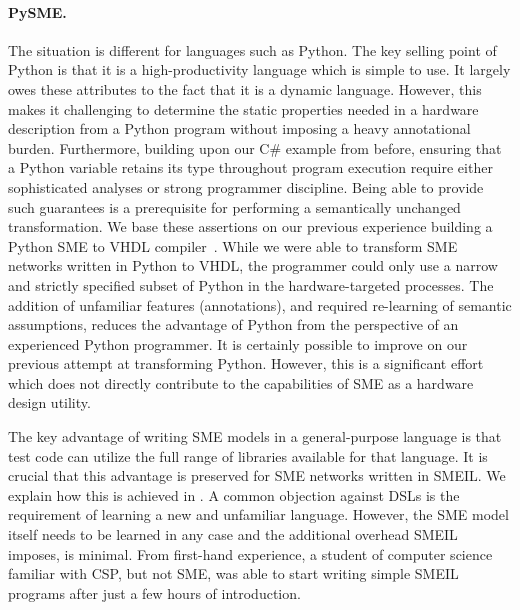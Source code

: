 \paragraph{PySME.}
The situation is different for languages such as Python. The key selling point
of Python is that it is a high-productivity language which is simple to use. It
largely owes these attributes to the fact that it is a dynamic
language. However, this makes it challenging to determine the static properties
needed in a hardware description from a Python program without imposing a heavy
annotational burden. Furthermore, building upon our C\# example from before,
ensuring that a Python variable retains its type throughout program execution
require either sophisticated analyses or strong programmer discipline. Being
able to provide such guarantees is a prerequisite for performing a semantically
unchanged transformation. We base these assertions on our previous experience
building a Python SME to VHDL compiler~\cite{asheim2016vhdl}. While we were able
to transform SME networks written in Python to VHDL, the programmer could only
use a narrow and strictly specified subset of Python in the hardware-targeted
processes. The addition of unfamiliar features (annotations), and required
re-learning of semantic assumptions, reduces the advantage of Python from the
perspective of an experienced Python programmer. It is certainly possible to
improve on our previous attempt at transforming Python. However, this is a
significant effort which does not directly contribute to the capabilities of SME
as a hardware design utility.


\vspace{1em} The key advantage of writing SME models in a general-purpose
language is that test code can utilize the full range of libraries available for
that language. It is crucial that this advantage is preserved for SME networks
written in SMEIL. We explain how this is achieved in . A common
objection against DSLs is the requirement of learning a new and unfamiliar
language. However, the SME model itself needs to be learned in any case and the
additional overhead SMEIL imposes, is minimal. From first-hand experience, a
student of computer science familiar with CSP, but not SME, was able to start
writing simple SMEIL programs after just a few hours of introduction.

